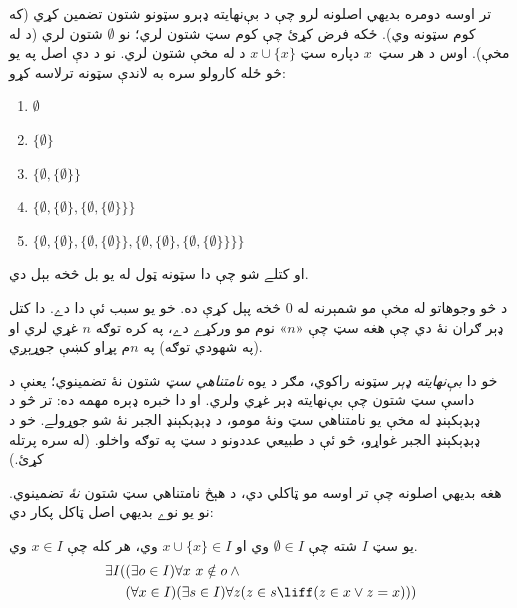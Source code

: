 \documentclass[../../../include/open-logic-section]{subfiles}
\begin{document}

تر اوسه دومره بديهي اصلونه لرو چې د بې‌نهايته ډېرو سټونو شتون
تضمين کړي (که کوم سټونه وي). ځکه فرض کړئ چې کوم سټ شتون لري؛
نو $\emptyset$ شتون لري (د  له مخې).
اوس د هر سټ~$x$ دپاره سټ $x \cup \{x\}$ د
 له مخې شتون لري.
نو د دې اصل په يو څو ځله کارولو سره به لاندې سټونه ترلاسه کړو:
\begin{enumerate}
	\item[0.] $\emptyset$ %
	\item[1.] $ \{\emptyset\}$ %
	\item[2.] $\{\emptyset, \{\emptyset\}\}$ %
	\item[3.] $\{\emptyset, \{\emptyset\}, \{\emptyset, \{\emptyset\}\}\}$ %
	\item[4.] $\{\emptyset, \{\emptyset\}, \{\emptyset, \{\emptyset\}\}, \{\emptyset, \{\emptyset\}, \{\emptyset, \{\emptyset\}\}\}\}$%
\end{enumerate}
او کتلے شو چې دا سټونه ټول له يو بل څخه بېل دي.

د څو وجوهاتو له مخې مو شمېرنه له $0$ څخه پېل کړې ده. خو يو
سبب ئې دا دے. دا کتل ډېر ګران نۀ دي چې هغه سټ چې «$n$» نوم مو
ورکړے دے، په کره توګه $n$ غړي لري او (په شهودي توګه) په
$n$م پړاو کښې جوړېږي.

خو دا \emph{بې‌نهايته ډېر} سټونه راکوي، مګر د يوه \emph{نامتناهي سټ}
شتون نۀ تضمينوي؛ يعنې د داسې سټ شتون چې بې‌نهايته ډېر غړي ولري.
او دا خبره ډېره مهمه ده: تر څو د ډېډېکېنډ له مخې يو نامتناهي سټ
ونۀ مومو، د ډېډېکېنډ الجبر نۀ شو جوړولے. خو د ډېډېکېنډ الجبر
غواړو، څو ئې د طبيعي عددونو د سټ په توګه واخلو. (له
 سره پرتله کړئ.)

هغه بديهي اصلونه چې تر اوسه مو ټاکلي دي، د هېڅ نامتناهي سټ
شتون \emph{نۀ} تضمينوي. نو يو نوے بديهي اصل ټاکل پکار دي:

\begin{axiom}[نامتناهيت]
يو سټ $I$ شته چې $\emptyset \in I$ وي او $x \cup \{x\} \in I$ وي، هر کله چې $x \in I$ وي.
\begin{align*}
	\exists I( & (\exists o \in I)\forall x\ x \notin o \land {}\\
	& (\forall x \in I)(\exists s \in I)\forall z(z \in s \liff (z \in x \lor z = x)))
\end{align*}
\end{axiom}
\end{document}
